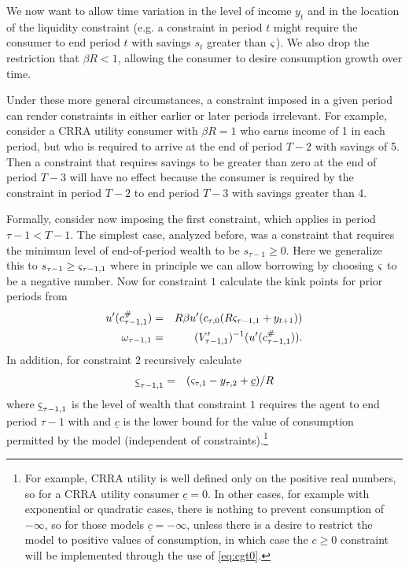We now want to allow time variation in the level of income ${y}_{t}$ and in the location of the liquidity constraint (e.g$.$ a constraint in period $t$ might require the consumer to end period $t$ with savings $s_{t}$ greater than $\varsigma$).  We also drop the restriction that $\beta R < 1$, allowing the consumer to desire consumption growth over time.

Under these more general circumstances, a constraint imposed in a given period can render constraints in either earlier or later periods irrelevant.  For example, consider a CRRA utility consumer with $\beta R=1$ who earns income of 1 in each period, but who is required to arrive at the end of period $T-2$ with savings of 5.  Then a constraint that requires savings to be greater than zero at the end of period $T-3$ will have no effect because the consumer is required by the constraint in period $T-2$ to end period $T-3$ with savings greater than 4.

Formally, consider now imposing the first constraint, which applies in period $\tau-1 < T-1$.  The simplest case, analyzed before, was a constraint that requires the minimum level of end-of-period wealth to be $s_{\tau-1} \geq 0$.  Here we generalize this to $s_{\tau-1} \geq \varsigma_{\tau-1,1}$ where in principle we can allow borrowing by choosing $\varsigma$ to be a negative number. Now for constraint $1$ calculate the kink points for prior periods from
\begin{eqnarray}
  u'(c_{\tau-1,1}^{\#}) & = & R\beta u'(c_{\tau,0}(R\varsigma_{\tau-1,1}+{y}_{t+1}))
\\ \omega_{\tau-1,1} & = & (V_{\tau-1,1}')^{-1}(u'(c_{\tau-1,1}^{\#})).
\end{eqnarray}
In addition, for constraint $2$ recursively calculate
\begin{eqnarray}
\underline{\varsigma}_{\tau-1,1} & = & (\varsigma_{\tau,1}-{y}_{\tau,2}+\underline{c})/R  \label{eq:cgt0}
\end{eqnarray}
where $\underline{\varsigma}_{\tau-1,1}$ is the level of wealth that constraint $1$ requires the agent to end period $\tau-1$ with and $\underline{c}$ is the lower bound for the value of consumption permitted by the model (independent of constraints).\footnote{For example, CRRA utility is well defined only on the positive real numbers, so for a CRRA utility consumer $\underline{c}=0$.  In other cases, for example with exponential or quadratic cases, there is nothing to prevent consumption of $-\infty$, so for those models $\underline{c}=-\infty$, unless there is a desire to restrict the model to positive values of consumption, in which case the $c\geq 0$ constraint will be implemented through the use of \eqref{eq:cgt0}.}

